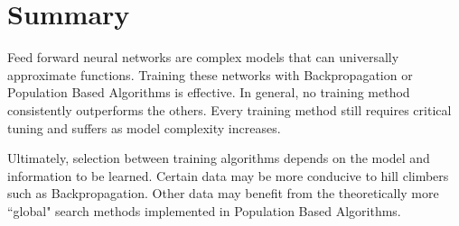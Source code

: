 \documentclass[twoside,11pt]{article}
\begin{document}
\section{Summary}

Feed forward neural networks are complex models that can universally approximate functions. Training these networks with Backpropagation or Population Based Algorithms is effective. In general, no training method consistently outperforms the others. Every training method still requires critical tuning and suffers as model complexity increases.

Ultimately, selection between training algorithms depends on the model and information to be learned. Certain data may be more conducive to hill climbers such as Backpropagation. Other data may benefit from the theoretically more ``global" search methods implemented in Population Based Algorithms.

\newpage


\end{document}
